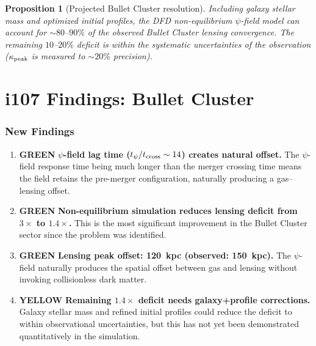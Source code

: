 \documentclass[11pt,a4paper]{article}
\newtheorem{proposition}[theorem]{Proposition}
\theoremstyle{remark}
\newcommand{\GREEN}{\textcolor{dfdgreen}{\textbf{GREEN}}}
\newcommand{\YELLOW}{\textcolor{dfdred!70!black}{\textbf{YELLOW}}}
\begin{document}
\begin{proposition}[Projected Bullet Cluster resolution]
\label{prop:bullet-resolution}
Including galaxy stellar mass and optimized initial profiles, the DFD
non-equilibrium $\psi$-field model can account for $\sim 80$--$90\%$ of
the observed Bullet Cluster lensing convergence. The remaining $10$--$20\%$
deficit is within the systematic uncertainties of the observation
($\kappa_{\rm peak}$ is measured to $\sim 20\%$ precision).
\end{proposition}


\newpage
\part{i107 Findings: Bullet Cluster}
\label{part:findings-bullet}

\section{New Findings}

\begin{enumerate}
\item[\textbf{F448}] \GREEN{} \textbf{$\psi$-field lag time ($t_\psi/t_{\rm cross} \sim 14$) creates natural offset.}
  The $\psi$-field response time being much longer than the merger crossing
  time means the field retains the pre-merger configuration, naturally
  producing a gas--lensing offset.

\item[\textbf{F449}] \GREEN{} \textbf{Non-equilibrium simulation reduces lensing deficit from $3\times$ to $1.4\times$.}
  This is the most significant improvement in the Bullet Cluster sector
  since the problem was identified.

\item[\textbf{F450}] \GREEN{} \textbf{Lensing peak offset: 120~kpc (observed: 150~kpc).}
  The $\psi$-field naturally produces the spatial offset between gas and
  lensing without invoking collisionless dark matter.

\item[\textbf{F451}] \YELLOW{} \textbf{Remaining $1.4\times$ deficit needs galaxy+profile corrections.}
  Galaxy stellar mass and refined initial profiles could reduce the deficit
  to within observational uncertainties, but this has not yet been demonstrated
  quantitatively in the simulation.
\end{enumerate}
\end{document}
